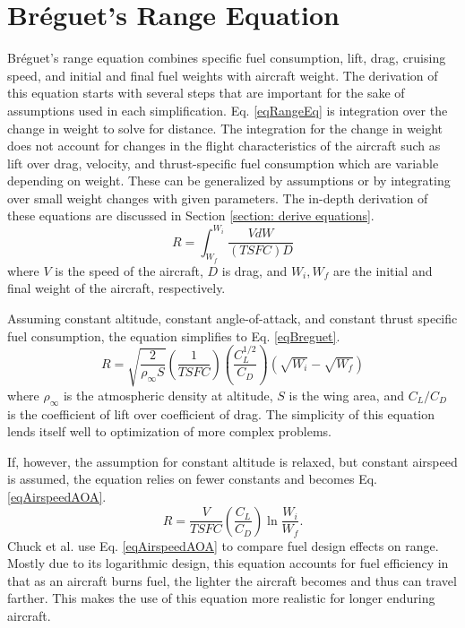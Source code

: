 \section{Br\'eguet's Range Equation}
\hspace{.5cm} Br\'eguet's range equation combines specific fuel consumption, lift, drag, cruising speed, and initial and final fuel weights with aircraft weight. The derivation of this equation starts with several steps that are important for the sake of assumptions used in each simplification. Eq. \ref{eqRangeEq} is integration over the change in weight to solve for distance. The integration for the change in weight does not account for changes in the flight characteristics of the aircraft such as lift over drag, velocity, and thrust-specific fuel consumption which are variable depending on weight. These can be generalized by assumptions or by integrating over small weight changes with given parameters. The in-depth derivation of these equations are discussed in Section \ref{section: derive equations}.
\begin{equation}
    R = \int_{W_f}^{W_i}\dfrac{VdW}{(TSFC)D}
    \label{eqRangeEq}
\end{equation}
where $V$ is the speed of the aircraft, $D$ is drag, and $W_i,W_f$ are the initial and final weight of the aircraft, respectively. \par 
Assuming constant altitude, constant angle-of-attack, and constant thrust specific fuel consumption, the equation simplifies to Eq. \ref{eqBreguet}.
\begin{equation}
\label{eqBreguet}
R = \sqrt{\dfrac{2}{\rho_\infty S}}\left(\dfrac{1}{TSFC}\right) \left(\dfrac{C_L^{1/2}}{C_D}\right)(\sqrt{W_i}-\sqrt{W_f})
\end{equation}
where $\rho_\infty$ is the atmospheric density at altitude, $S$ is the wing area, and $C_L/C_D$ is the coefficient of lift over coefficient of drag. The simplicity of this equation lends itself well to optimization of more complex problems. \par 
If, however, the assumption for constant altitude is relaxed, but constant airspeed is assumed, the equation relies on fewer constants and becomes Eq. \ref{eqAirspeedAOA}.
\begin{equation}
\label{eqAirspeedAOA}
    R = \dfrac{V}{TSFC}\left(\dfrac{C_L}{C_D}\right)\ln\dfrac{W_i}{W_f}.
\end{equation}
Chuck et al. \cite{fuelsLOGRange} use Eq. \ref{eqAirspeedAOA} to compare fuel design effects on range. Mostly due to its logarithmic design, this equation accounts for fuel efficiency in that as an aircraft burns fuel, the lighter the aircraft becomes and thus can travel farther. This makes the use of this equation more realistic for longer enduring aircraft. \par
